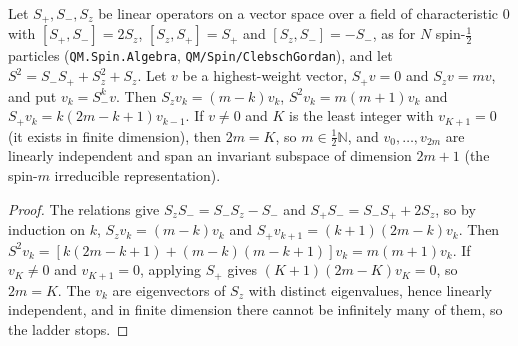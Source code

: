\begin{theorem}\label{thm:su2-ladder}
  \leanok
  Let $S_+,S_-,S_z$ be linear operators on a vector space over a field of characteristic $0$ with $[S_+,S_-]=2S_z$,
  $[S_z,S_+]=S_+$ and $[S_z,S_-]=-S_-$, as for $N$ spin-$\tfrac12$ particles (\texttt{QM.Spin.Algebra}, \texttt{QM/Spin/ClebschGordan}), and let
  $S^2=S_-S_++S_z^2+S_z$. Let $v$ be a highest-weight vector, $S_+v=0$ and $S_zv=mv$, and put $v_k=S_-^kv$. Then
  $S_zv_k=(m-k)v_k$, $S^2v_k=m(m+1)v_k$ and $S_+v_k=k(2m-k+1)v_{k-1}$. If $v\ne0$ and $K$ is the least integer with
  $v_{K+1}=0$ (it exists in finite dimension), then $2m=K$, so $m\in\tfrac12\mathbb N$, and $v_0,\dots,v_{2m}$ are linearly
  independent and span an invariant subspace of dimension $2m+1$ (the spin-$m$ irreducible representation).
\end{theorem}
\begin{proof}\leanok
  The relations give $S_zS_-=S_-S_z-S_-$ and $S_+S_-=S_-S_++2S_z$, so by induction on $k$, $S_zv_k=(m-k)v_k$ and
  $S_+v_{k+1}=(k+1)(2m-k)v_k$. Then $S^2v_k=[k(2m-k+1)+(m-k)(m-k+1)]v_k=m(m+1)v_k$. If $v_K\ne0$ and $v_{K+1}=0$, applying
  $S_+$ gives $(K+1)(2m-K)v_K=0$, so $2m=K$. The $v_k$ are eigenvectors of $S_z$ with distinct eigenvalues, hence linearly
  independent, and in finite dimension there cannot be infinitely many of them, so the ladder stops.
\end{proof}

